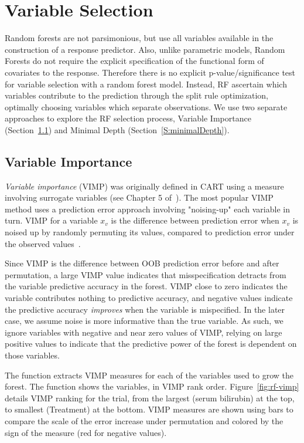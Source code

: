 \documentclass[nojss]{jss}\usepackage[]{graphicx}\usepackage[]{color}
\begin{document}
\section{Variable Selection}\label{S:variableselection}

Random forests are not parsimonious, but use all variables available in the construction of a response predictor. Also, unlike parametric models, Random Forests do not require the explicit specification of the functional form of covariates to the response. Therefore there is no explicit p-value/significance test for variable selection with a random forest model. Instead, RF ascertain which variables contribute to the prediction through the split rule optimization, optimally choosing variables which separate observations. We use two separate approaches to explore the RF selection process, Variable Importance (Section~\ref{S:vimp}) and Minimal Depth (Section~\ref{S:minimalDepth}).

\subsection{Variable Importance}\label{S:vimp}

\emph{Variable importance} (VIMP) was originally defined in CART using a measure involving surrogate variables (see Chapter 5 of~\cite{cart:1984}). The most popular VIMP method uses a prediction error approach involving "noising-up" each variable in turn. VIMP for a variable $x_v$ is the difference between prediction error when $x_v$ is noised up by randomly permuting its values, compared to prediction error under the observed values~\citep{Breiman:2001,Liaw:2002,Ishwaran:2007,Ishwaran:2008}.

Since VIMP is the difference between OOB prediction error before and after permutation, a large VIMP value indicates that misspecification detracts from the variable predictive accuracy in the forest. VIMP close to zero indicates the variable contributes nothing to predictive accuracy, and negative values indicate the predictive accuracy \emph{improves} when the variable is mispecified. In the later case, we assume noise is more informative than the true variable. As such, we ignore variables with negative and near zero values of VIMP, relying on large positive values to indicate that the predictive power of the forest is dependent on those variables. 

The  function extracts VIMP measures for each of the variables used to grow the forest. The  function shows the variables, in VIMP rank order. Figure~\ref{fig:rf-vimp} details VIMP ranking for the  trial, from the largest (serum bilirubin) at the top, to smallest (Treatment) at the bottom. VIMP measures are shown using bars to compare the scale of the error increase under permutation and colored by the sign of the measure (red for negative values). 
\end{document}
